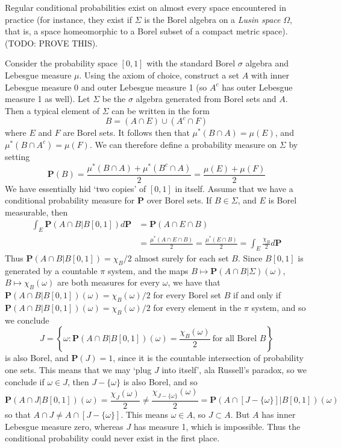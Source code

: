 Regular conditional probabilities exist on almost every space encountered in practice (for instance, they exist if $\Sigma$ is the Borel algebra on a {\it Lusin space} $\Omega$, that is, a space homeomorphic to a Borel subset of a compact metric space). (TODO: PROVE THIS).

\begin{example}
    Consider the probability space $[0,1]$ with the standard Borel $\sigma$ algebra and Lebesgue measure $\mu$. Using the axiom of choice, construct a set $A$ with inner Lebesgue measure 0 and outer Lebesgue measure 1 (so $A^c$ has outer Lebesgue measure 1 as well). Let $\Sigma$ be the $\sigma$ algebra generated from Borel sets and $A$. Then a typical element of $\Sigma$ can be written in the form
    \[ B = (A \cap E) \cup (A^c \cap F) \]
    where $E$ and $F$ are Borel sets. It follows then that $\mu^*(B \cap A) = \mu(E)$, and $\mu^*(B \cap A^c) = \mu(F)$. We can therefore define a probability measure on $\Sigma$ by setting
    \[ \mathbf{P}(B) = \frac{\mu^*(B \cap A) + \mu^*(B^c \cap A)}{2} = \frac{\mu(E) + \mu(F)}{2} \]
    We have essentially hid `two copies' of $[0,1]$ in itself. Assume that we have a conditional probability measure for $\mathbf{P}$ over Borel sets. If $B \in \Sigma$, and $E$ is Borel measurable, then
    \begin{align*}
        \int_E \mathbf{P}(A \cap B|B [0,1]) d\mathbf{P} &= \mathbf{P}(A \cap E \cap B)\\
        &= \frac{\mu^*(A \cap E \cap B)}{2} = \frac{\mu^*(E \cap B)}{2} = \int_E \frac{\chi_B}{2} d\mathbf{P}
    \end{align*}
    Thus $\mathbf{P}(A \cap B|B[0,1]) = \chi_B/2$ almost surely for each set $B$. Since $B[0,1]$ is generated by a countable $\pi$ system, and the maps $B \mapsto \mathbf{P}(A \cap B|\Sigma)(\omega)$, $B \mapsto \chi_B(\omega)$ are both measures for every $\omega$, we have that $\mathbf{P}(A \cap B|B[0,1])(\omega) = \chi_B(\omega)/2$ for every Borel set $B$ if and only if $\mathbf{P}(A \cap B|B[0,1])(\omega) = \chi_B(\omega)/2$ for every element in the $\pi$ system, and so we conclude
    \[ J = \left\{ \omega: \mathbf{P}(A \cap B|B[0,1])(\omega) = \frac{\chi_B(\omega)}{2}\ \text{for all Borel $B$} \right\} \]
    is also Borel, and $\mathbf{P}(J) = 1$, since it is the countable intersection of probability one sets. This means that we may `plug $J$ into itself', ala Russell's paradox, so we conclude if $\omega \in J$, then $J - \{ \omega \}$ is also Borel, and so
    \[ \mathbf{P}(A \cap J|B[0,1])(\omega) = \frac{\chi_J(\omega)}{2} \neq \frac{\chi_{J - \{ \omega \}}(\omega)}{2} = \mathbf{P}(A \cap [J - \{ \omega \}]|B[0,1])(\omega) \]
    so that $A \cap J \neq A \cap [J - \{ \omega \}]$. This means $\omega \in A$, so $J \subset A$. But $A$ has inner Lebesgue measure zero, whereas $J$ has measure 1, which is impossible. Thus the conditional probability could never exist in the first place.
\end{example}

